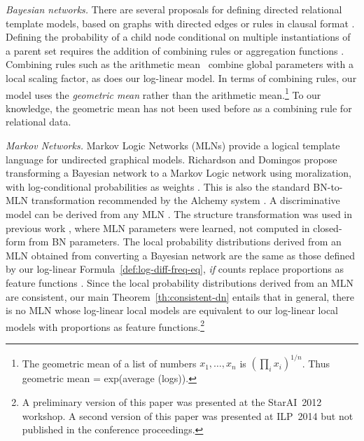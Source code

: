 \documentclass[runningheads,a4paper]{llncs}
\begin{document}
\emph{Bayesian networks.} There are several proposals for defining directed relational template models, based on graphs with directed edges or rules in clausal format \cite{Kersting2007,Getoor2007c}. Defining the probability of a child node conditional on multiple instantiations of a parent set requires the addition of combining rules \cite{Kersting2007} or aggregation functions \cite{Getoor2007c}. 
Combining rules such as the arithmetic mean~\cite{Natarajan2008} combine global parameters with a local scaling factor, as does our log-linear model. In terms of combining rules,  our model uses the {\em geometric mean} rather than the arithmetic mean.\footnote{The geometric mean of a list of numbers $x_{1},\ldots,x_{n}$ is $(\prod_{i} x_{i})^{1/n}$. %
Thus geometric mean = exp(average (logs)).} To our knowledge, the geometric mean has not been used before as a combining rule for relational data.  

\emph{Markov Networks.} Markov Logic Networks (MLNs) provide a logical template language for undirected graphical models. 
Richardson and Domingos propose transforming a Bayesian network to a Markov Logic network using moralization, with log-conditional probabilities as weights \cite{Domingos2009}. 
This is also the standard BN-to-MLN transformation recommended by the Alchemy system \cite{bib:bayes-convert}. A discriminative model can be derived from any MLN \cite{Domingos2009}.  The structure transformation was used in previous work \cite{Schulte2012}, where MLN parameters were learned, not computed in closed-form from BN parameters. The local probability distributions derived from an MLN obtained from converting a Bayesian network are the same as those defined by our log-linear Formula~\ref{def:log-diff-freq-eq}, {\em if} counts replace proportions as feature functions \cite{Schulte2011}. Since the local probability distributions derived from an MLN are consistent, our main Theorem~\ref{th:consistent-dn} entails that in general, there is no MLN whose log-linear local models are equivalent to our log-linear local models with  proportions as feature functions.\footnote{A preliminary version of this paper was presented at the StarAI~2012 workshop. A second version of this paper was presented at ILP~2014 but not published in the conference proceedings.}
 
\end{document}
